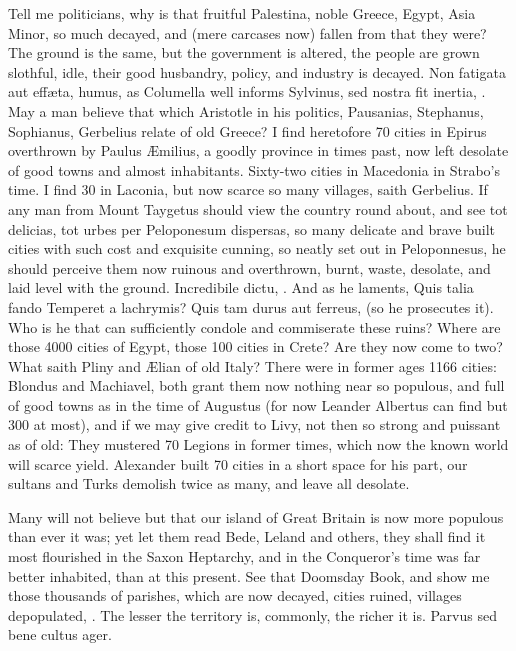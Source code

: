 {Tell me politicians, why is that fruitful Palestina, noble Greece,
Egypt, Asia Minor, so much decayed, and (mere carcases now) fallen from
that they were? The ground is the same, but the government is altered,
the people are grown slothful, idle, their good husbandry, policy, and
industry is decayed. Non fatigata aut eff\ae{}ta, humus, as Columella
well informs Sylvinus, sed nostra fit inertia, \etc{}. May a man believe
that which Aristotle in his politics, Pausanias, Stephanus, Sophianus,
Gerbelius relate of old Greece? I find heretofore 70 cities in Epirus
overthrown by Paulus \AE{}milius, a goodly province in times past,
now left desolate of good towns and almost inhabitants. Sixty-two
cities in Macedonia in Strabo's time. I find 30 in Laconia, but now
scarce so many villages, saith Gerbelius. If any man from Mount
Taygetus should view the country round about, and see tot delicias, tot
urbes per Peloponesum dispersas, so many delicate and brave built
cities with such cost and exquisite cunning, so neatly set out in
Peloponnesus, he should perceive them now ruinous and overthrown,
burnt, waste, desolate, and laid level with the ground. Incredibile
dictu, \etc{}. And as he laments, Quis talia fando Temperet a lachrymis?
Quis tam durus aut ferreus, (so he prosecutes it). Who is he that
can sufficiently condole and commiserate these ruins? Where are those
4000 cities of Egypt, those 100 cities in Crete? Are they now come to
two? What saith Pliny and \AE{}lian of old Italy? There were in former
ages 1166 cities: Blondus and Machiavel, both grant them now nothing
near so populous, and full of good towns as in the time of Augustus
(for now Leander Albertus can find but 300 at most), and if we may give
credit to Livy, not then so strong and puissant as of old: They
mustered 70 Legions in former times, which now the known world will
scarce yield. Alexander built 70 cities in a short space for his part,
our sultans and Turks demolish twice as many, and leave all desolate.

Many will not believe but that our island of Great Britain is now more
populous than ever it was; yet let them read Bede, Leland and others,
they shall find it most flourished in the Saxon Heptarchy, and in the
Conqueror's time was far better inhabited, than at this present. See
that Doomsday Book, and show me those thousands of parishes, which are
now decayed, cities ruined, villages depopulated, \etc{}. The lesser the
territory is, commonly, the richer it is. Parvus sed bene cultus ager.

}
